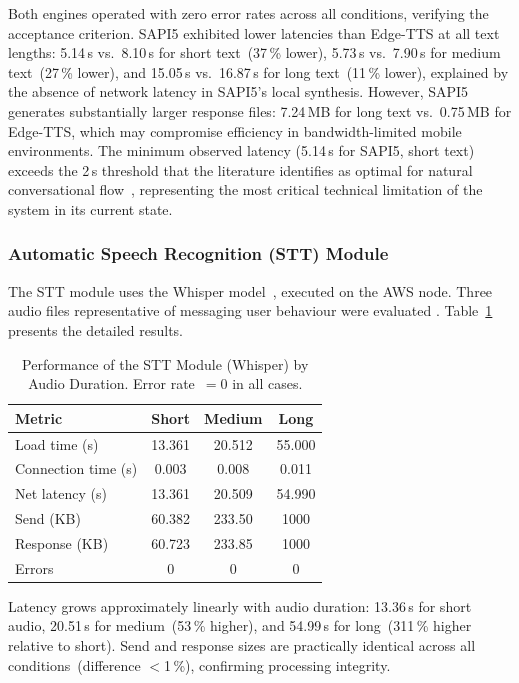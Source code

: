 \documentclass[journal]{IEEEtran}
\begin{document}
	Both engines operated with zero error rates across all conditions,
	verifying the acceptance criterion.
	SAPI5 exhibited lower latencies than Edge-TTS at all text lengths:
	5.14\,s vs.\ 8.10\,s for short text~(37\,\% lower), 5.73\,s
	vs.\ 7.90\,s for medium text~(27\,\% lower), and 15.05\,s
	vs.\ 16.87\,s for long text~(11\,\% lower), explained by the
	absence of network latency in SAPI5's local synthesis.
	However, SAPI5 generates substantially larger response files:
	7.24\,MB for long text vs.\ 0.75\,MB for Edge-TTS, which may
	compromise efficiency in bandwidth-limited mobile environments.
	The minimum observed latency (5.14\,s for SAPI5, short text)
	exceeds the 2\,s threshold that the literature identifies as
	optimal for natural conversational flow~\cite{tan2021},
	representing the most critical technical limitation of the
	system in its current state.
	
	\subsubsection{Automatic Speech Recognition (STT) Module}
	The STT module uses the Whisper model~\cite{radford2023},
	executed on the AWS node.
	Three audio files representative of messaging user behaviour
	were evaluated \cite{botelho2021}.
	Table~\ref{tab:stt} presents the detailed results.
	
	\begin{table}[!t]
		\caption{Performance of the STT Module (Whisper) by Audio Duration.
			Error rate~$=0$ in all cases.}
		\label{tab:stt}
		\centering
		\scriptsize
		\renewcommand{\arraystretch}{1.25}
		\begin{tabular}{lccc}
			\toprule
			\textbf{Metric} & \textbf{Short} & \textbf{Medium} & \textbf{Long} \\
			\midrule
			Load time (s)       & 13.361  & 20.512  & 55.000 \\
			Connection time (s) & 0.003   & 0.008   & 0.011  \\
			Net latency (s)     & 13.361  & 20.509  & 54.990 \\
			Send (KB)           & 60.382  & 233.50  & 1000   \\
			Response (KB)       & 60.723  & 233.85  & 1000   \\
			Errors              & 0       & 0       & 0      \\
			\bottomrule
		\end{tabular}
	\end{table}
	
	Latency grows approximately linearly with audio duration:
	13.36\,s for short audio, 20.51\,s for medium~(53\,\% higher),
	and 54.99\,s for long~(311\,\% higher relative to short).
	Send and response sizes are practically identical across all
	conditions~(difference $<$1\,\%), confirming processing integrity.
	
\end{document}
